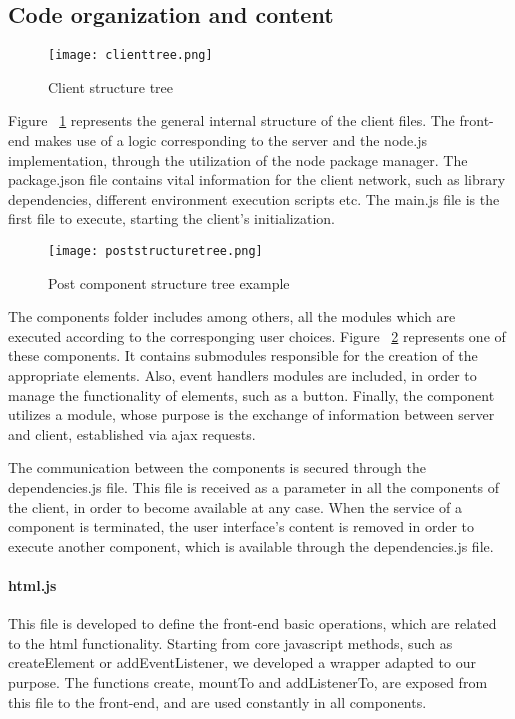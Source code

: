 \subsection{Code organization and content}
\begin{figure}
	\texttt{[image: clienttree.png]}
	\caption{Client structure tree}
	\label{clienttree}
\end{figure}
Figure ~\ref{clienttree} represents the general internal structure of the client files. The front-end makes use of a logic corresponding to the server and the node.js implementation, through the utilization of the node package manager. The package.json file contains vital information for the client network, such as library dependencies, different environment execution scripts etc. The main.js file is the first file to execute, starting the client's initialization. \par 
\begin{figure}
	\texttt{[image: poststructuretree.png]}
	\caption{Post component structure tree example}
	\label{poststructuretree}
\end{figure}
	The components folder includes among others, all the modules which are executed according to the corresponging user choices. Figure ~\ref{poststructuretree} represents one of these components. It contains submodules responsible for the creation of the appropriate elements. Also, event handlers modules are included, in order to manage the functionality of elements, such as a button. Finally, the component utilizes a module, whose purpose is the exchange of information between server and client, established via ajax requests.\par
	The communication between the components is secured through the dependencies.js file. This file is received as a parameter in all the components of the client, in order to become available at any case. When the service of a component is terminated, the user interface's content is removed in order to execute another component, which is available through the dependencies.js file.

\paragraph{html.js}
This file is developed to define the front-end basic operations, which are related to the html functionality. Starting from core javascript methods, such as createElement or addEventListener, we developed a wrapper adapted to our purpose. The functions create, mountTo and addListenerTo, are exposed from this file to the front-end, and are used constantly in all components. 

